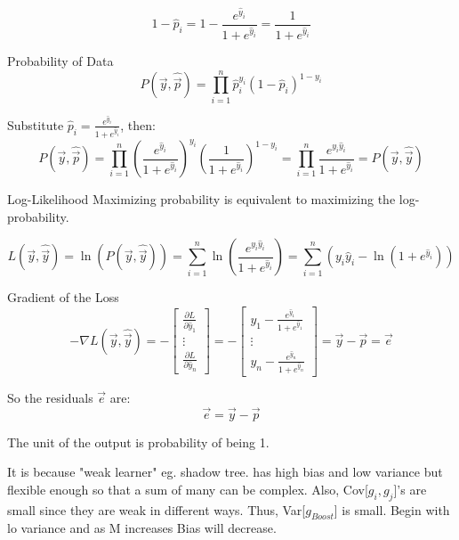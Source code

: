 \documentclass[12pt]{article}
\begin{document}
\begin{enumerate}
\[
1 - \hat{p}_i = 1 - \frac{e^{\hat{y}_i}}{1 + e^{\hat{y}_i}} = \frac{1}{1 + e^{\hat{y}_i}}
\]

Probability of Data
\[
P(\vec{y}, \hat{\vec{p}}) = \prod_{i=1}^n \hat{p}_i^{y_i} (1 - \hat{p}_i)^{1 - y_i}
\]

Substitute \( \hat{p}_i = \frac{e^{\hat{y}_i}}{1 + e^{\hat{y}_i}} \), then:
\[
P(\vec{y}, \hat{\vec{p}}) = \prod_{i=1}^n \left( \frac{e^{\hat{y}_i}}{1 + e^{\hat{y}_i}} \right)^{y_i} \left( \frac{1}{1 + e^{\hat{y}_i}} \right)^{1 - y_i}
= \prod_{i=1}^n \frac{e^{y_i \hat{y}_i}}{1 + e^{\hat{y}_i}} = P(\vec{y}, \hat{\vec{y}})
\]

Log-Likelihood
Maximizing probability is equivalent to maximizing the log-probability.

\[
L(\vec{y}, \hat{\vec{y}}) = \ln \left( P(\vec{y}, \hat{\vec{y}}) \right)
= \sum_{i=1}^n \ln\left( \frac{e^{y_i \hat{y}_i}}{1 + e^{\hat{y}_i}} \right)
= \sum_{i=1}^n \left( y_i \hat{y}_i - \ln(1 + e^{\hat{y}_i}) \right)
\]

Gradient of the Loss
\[
-\nabla L(\vec{y}, \hat{\vec{y}}) = -
\begin{bmatrix}
\frac{\partial L}{\partial \hat{y}_1} \\
\vdots \\
\frac{\partial L}{\partial \hat{y}_n}
\end{bmatrix}
= -
\begin{bmatrix}
y_1 - \frac{e^{\hat{y}_1}}{1 + e^{\hat{y}_1}} \\
\vdots \\
y_n - \frac{e^{\hat{y}_n}}{1 + e^{\hat{y}_n}}
\end{bmatrix}
= \vec{y} - \vec{p} = \vec{e}
\]

So the residuals \( \vec{e} \) are:
\[
\vec{e} = \vec{y} - \vec{p}
\]


The unit of the output is probability of being 1.


It is because "weak learner" eg. shadow tree. has high bias and low variance but flexible enough so that a sum of many can be complex. Also, Cov[$g_i, g_j$]'s are small since they are weak in different ways. Thus, Var[$g_{Boost}$] is small. Begin with lo variance and as M increases Bias will decrease.


\end{enumerate}
\end{document}
